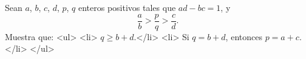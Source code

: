 Sean $a$, $b$, $c$, $d$, $p$, $q$ enteros positivos tales que $ad-bc=1$, y 
\[\frac ab \gt \frac pq \gt \frac cd.\]
Muestra que:
<ul>
<li> $q\geq b+d$.</li>
<li> Si $q=b+d$, entonces $p=a+c$.</li>
</ul>